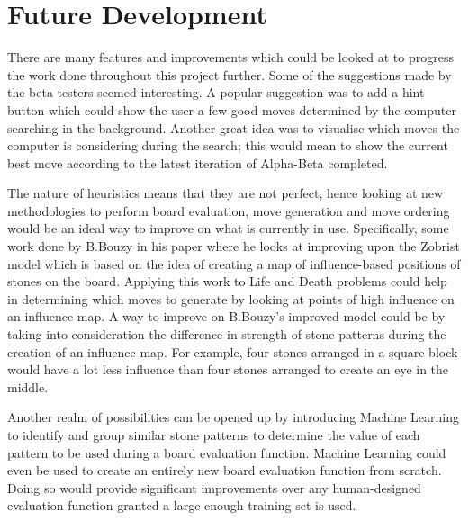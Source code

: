 \documentclass{l4proj}
\begin{document}
\section{Future Development}
There are many features and improvements which could be looked at to progress the work done throughout this project further. Some of the suggestions made by the beta testers seemed interesting. A popular suggestion was to add a hint button which could show the user a few good moves determined by the computer searching in the background. Another great idea was to visualise which moves the computer is considering during the search; this would mean to show the current best move according to the latest iteration of Alpha-Beta completed.

The nature of heuristics means that they are not perfect, hence looking at new methodologies to perform board evaluation, move generation and move ordering would be an ideal way to improve on what is currently in use. Specifically, some work done by B.Bouzy in his paper \cite{Bouzy2003} where he looks at improving upon the Zobrist model \cite{Zobrist1969} which is based on the idea of creating a map of influence-based positions of stones on the board. Applying this work to Life and Death problems could help in determining which moves to generate by looking at points of high influence on an influence map. A way to improve on B.Bouzy's improved model could be by taking into consideration the difference in strength of stone patterns during the creation of an influence map. For example, four stones arranged in a square block would have a lot less influence than four stones arranged to create an eye in the middle.

Another realm of possibilities can be opened up by introducing Machine Learning to identify and group similar stone patterns to determine the value of each pattern to be used during a board evaluation function. Machine Learning could even be used to create an entirely new board evaluation function from scratch. Doing so would provide significant improvements over any human-designed evaluation function granted a large enough training set is used.
\end{document}
